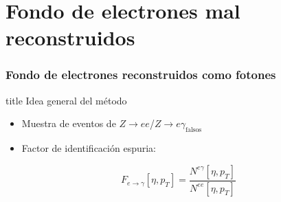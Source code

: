 \documentclass[10pt, compress,spanish]{beamer}
\begin{document}
\section{Fondo de electrones mal reconstruidos}
\begin{frame}[fragile]

\frametitle{Fondo de electrones reconstruidos como fotones}

\normalsize
\begin{beamercolorbox}[leftskip=\titlelf]{title}
 Idea general del método
\end{beamercolorbox}

\normalsize

\begin{itemize}
\item Muestra de eventos de $Z\rightarrow ee$/$Z\rightarrow e\gamma_{\text{falsos}}$

\item Factor de identificación espuria: 
\end{itemize}





\begin{equation*}
F_{e\rightarrow\gamma}[\eta , p_{T}]=\frac{N^{e\gamma}[\eta , p_{T}]}{N^{ee}[\eta , p_{T}]} \label{eq:ff_ratio}
\end{equation*}


\end{frame}



\end{document}
